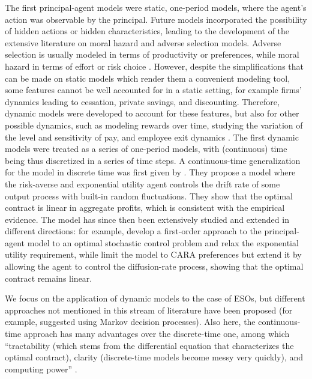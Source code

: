    The first principal-agent models were static, one-period models, where the agent's action was observable by the principal. Future models incorporated the possibility of hidden actions or hidden characteristics, leading to the development of the extensive literature on moral hazard and adverse selection models. Adverse selection is usually modeled in terms of productivity or preferences, while moral hazard in terms of effort or risk choice \citep{cvitanic2017moral}. However, despite the simplifications that can be made on static models which render them a convenient modeling tool, some features cannot be well accounted for in a static setting, for example firms' dynamics leading to cessation, private savings, and discounting. Therefore, dynamic models were developed to account for these features, but also for other possible dynamics, such as modeling rewards over time, studying the variation of the level and sensitivity of pay, and employee exit dynamics \citep{edmans2017executive}. The first dynamic models were treated as a series of one-period models, with (continuous) time being thus discretized in a series of time steps. A continuous-time generalization for the model in discrete time was first given by \citet{holmstrom1987aggregation}. They propose a model where the risk-averse and exponential utility agent controls the drift rate of some output process with built-in random fluctuations. They show that the optimal contract is linear in aggregate profits, which is consistent with the empirical evidence. The model has since then been extensively studied and extended in different directions: for example, \citet{schattler1993first} develop a first-order approach to the principal-agent model to an optimal stochastic control problem and relax the exponential utility requirement, while \citet{sung1995linearity} limit the model to CARA preferences but extend it by allowing the agent to control the diffusion-rate process, showing that the optimal contract remains linear.

    We focus on the application of dynamic models to the case of ESOs, but different approaches not mentioned in this stream of literature have been proposed (for example, \citet{plambeck2000performance} suggested using Markov decision processes). 
    Also here, the continuous-time approach has many advantages over the discrete-time one, among which ``tractability (which stems from the differential equation that characterizes the optimal contract), clarity (discrete-time models become messy very quickly), and computing power'' \citep{sannikov2013contracts}.  

